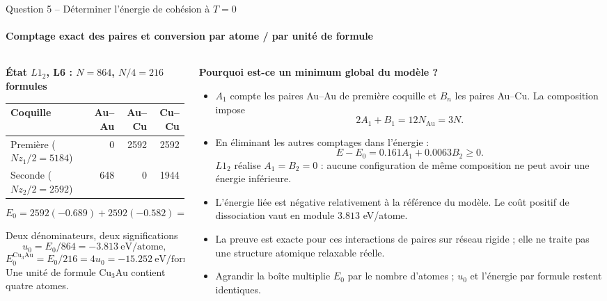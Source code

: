 \documentclass[aspectratio=169,10pt]{beamer}
\newcommand{\Au}{\mathrm{Au}}
\newcommand{\Cu}{\mathrm{Cu}}
\newcommand{\tightlist}{\setlength{\itemsep}{2pt}\setlength{\parskip}{0pt}}
\begin{document}
\begin{frame}[t]{Question 5 -- Déterminer l'énergie de cohésion à $T=0$}
\framesubtitle{Comptage exact des paires et conversion par atome / par unité de formule}
\begin{columns}[T,onlytextwidth]
\begin{column}{.49\textwidth}
\textbf{État $L1_2$, L6 : $N=864$, $N/4=216$ formules}
\begin{center}
\begin{tabular}{lrrr}\toprule
Coquille & Au--Au & Au--Cu & Cu--Cu\\\midrule
Première ($Nz_1/2=5184$) & 0 & 2592 & 2592\\
Seconde ($Nz_2/2=2592$) & 648 & 0 & 1944\\\bottomrule
\end{tabular}
\end{center}
\[
E_0=2592(-0.689)+2592(-0.582)
=\boxed{-3294.432\ \mathrm{eV}}.
\]
\begin{block}{Deux dénominateurs, deux significations}
\[
u_0=E_0/864=\boxed{-3.813\ \mathrm{eV/atome}},
\]
\[
E_0^{\Cu_3\Au}=E_0/216=4u_0
=\boxed{-15.252\ \mathrm{eV/formule}}.
\]
Une unité de formule Cu$_3$Au contient quatre atomes.
\end{block}
\end{column}
\begin{column}{.48\textwidth}
\textbf{Pourquoi est-ce un minimum global du modèle ?}

\begin{itemize}\tightlist
\item $A_1$ compte les paires Au--Au de première coquille et $B_n$ les paires Au--Cu. La composition impose
\[
2A_1+B_1=12N_{\Au}=3N.
\]
\item En éliminant les autres comptages dans l'énergie :
\[
\boxed{E-E_0=0.161A_1+0.0063B_2\geq0}.
\]
$L1_2$ réalise $A_1=B_2=0$ : aucune configuration de même composition ne peut avoir une énergie inférieure.
\item L'énergie liée est négative relativement à la référence du modèle. Le coût positif de dissociation vaut en module $3.813$ eV/atome.
\item La preuve est exacte pour ces interactions de paires sur réseau rigide ; elle ne traite pas une structure atomique relaxable réelle.
\item Agrandir la boîte multiplie $E_0$ par le nombre d'atomes ; $u_0$ et l'énergie par formule restent identiques.
\end{itemize}
\end{column}
\end{columns}
\end{frame}
\end{document}
